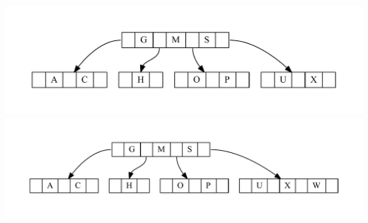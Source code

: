 \documentclass[11pt]{article}
\begin{document}
		\includegraphics[scale=.5]{step10.pdf}\\
		\includegraphics[scale=.5]{step11.pdf}\\	
		
	\newpage
	
\end{document}
